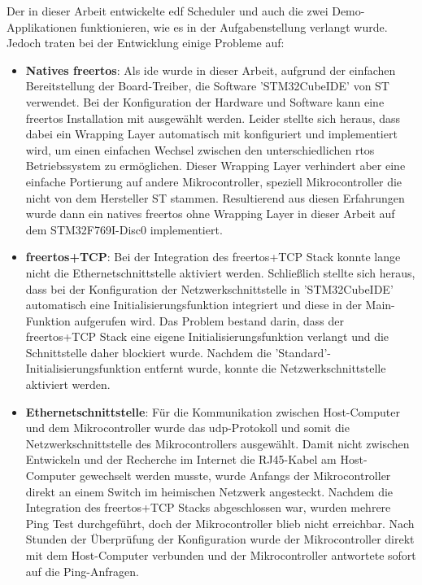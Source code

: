 \documentclass[../EDF Master Thesis.tex]{subfiles}
\begin{document}
    Der in dieser Arbeit entwickelte \ac{edf} Scheduler und auch die zwei Demo-Applikationen funktionieren, wie es in der Aufgabenstellung verlangt wurde.
    Jedoch traten bei der Entwicklung einige Probleme auf:
    \begin{itemize}
        \item \textbf{Natives \ac{freertos}}: Als \ac{ide} wurde in dieser Arbeit, aufgrund der einfachen Bereitstellung der Board-Treiber, die Software 'STM32CubeIDE' von ST verwendet.
            Bei der Konfiguration der Hardware und Software kann eine \ac{freertos} Installation mit ausgewählt werden.
            Leider stellte sich heraus, dass dabei ein Wrapping Layer automatisch mit konfiguriert und implementiert wird, um einen einfachen Wechsel zwischen den unterschiedlichen \ac{rtos} Betriebssystem zu ermöglichen.
            Dieser Wrapping Layer verhindert aber eine einfache Portierung auf andere Mikrocontroller, speziell Mikrocontroller die nicht von dem Hersteller ST stammen.
            Resultierend aus diesen Erfahrungen wurde dann ein natives \ac{freertos} ohne Wrapping Layer in dieser Arbeit auf dem STM32F769I-Disc0 implementiert.
        \item \textbf{\ac{freertos}+TCP}: Bei der Integration des \ac{freertos}+TCP Stack konnte lange nicht die Ethernetschnittstelle aktiviert werden.
            Schließlich stellte sich heraus, dass bei der Konfiguration der Netzwerkschnittstelle in 'STM32CubeIDE' automatisch eine Initialisierungsfunktion integriert und diese in der Main-Funktion aufgerufen wird.
            Das Problem bestand darin, dass der \ac{freertos}+TCP Stack eine eigene Initialisierungsfunktion verlangt und die Schnittstelle daher blockiert wurde.
            Nachdem die 'Standard'-Initialisierungsfunktion entfernt wurde, konnte die Netzwerkschnittstelle aktiviert werden.
        \item \textbf{Ethernetschnittstelle}: Für die Kommunikation zwischen Host-Computer und dem Mikrocontroller wurde das \ac{udp}-Protokoll und somit die Netzwerkschnittstelle des Mikrocontrollers ausgewählt.
            Damit nicht zwischen Entwickeln und der Recherche im Internet die RJ45-Kabel am Host-Computer gewechselt werden musste, wurde Anfangs der Mikrocontroller direkt an einem Switch im heimischen Netzwerk angesteckt.
            Nachdem die Integration des \ac{freertos}+TCP Stacks abgeschlossen war, wurden mehrere Ping Test durchgeführt, doch der Mikrocontroller blieb nicht erreichbar.
            Nach Stunden der Überprüfung der Konfiguration wurde der Mikrocontroller direkt mit dem Host-Computer verbunden und der Mikrocontroller antwortete sofort auf die Ping-Anfragen.

\end{itemize}
\end{document}
